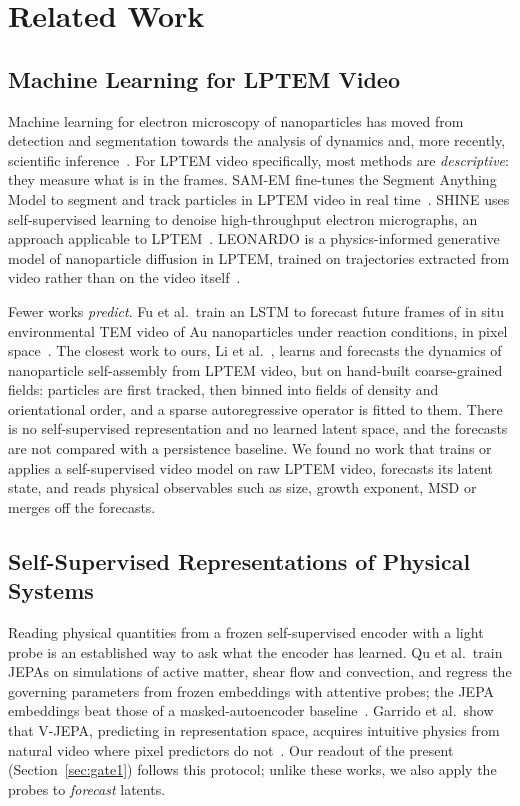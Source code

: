 \section{Related Work}
\label{sec:related}

\subsection{Machine Learning for LPTEM Video}

Machine learning for electron microscopy of nanoparticles has moved from detection and
segmentation towards the analysis of dynamics and, more recently, scientific
inference~\cite{toulkeridou2026review}. For LPTEM video specifically, most methods are
\emph{descriptive}: they measure what is in the frames. SAM-EM fine-tunes the Segment
Anything Model to segment and track particles in LPTEM video in real
time~\cite{samem}. SHINE uses self-supervised learning to denoise high-throughput
electron micrographs, an approach applicable to LPTEM~\cite{shine}. LEONARDO is a physics-informed
generative model of nanoparticle diffusion in LPTEM, trained on trajectories extracted
from video rather than on the video itself~\cite{leonardo}.

Fewer works \emph{predict}. Fu et al.\ train an LSTM to forecast future frames of in situ
environmental TEM video of Au nanoparticles under reaction conditions, in pixel
space~\cite{fu2022insitu}. The closest work to ours, Li et al.~\cite{li2026multiscale},
learns and forecasts the dynamics of nanoparticle self-assembly from LPTEM video, but on
hand-built coarse-grained fields: particles are first tracked, then binned into fields of
density and orientational order, and a sparse autoregressive operator is fitted to them.
There is no self-supervised representation and no learned latent space, and the forecasts
are not compared with a persistence baseline. We found no work that trains or applies a
self-supervised video model on raw LPTEM video, forecasts its latent state, and reads
physical observables such as size, growth exponent, MSD or merges off the forecasts.

\subsection{Self-Supervised Representations of Physical Systems}

Reading physical quantities from a frozen self-supervised encoder with a light probe is
an established way to ask what the encoder has learned. Qu et al.\ train JEPAs on
simulations of active matter, shear flow and convection, and regress the governing
parameters from frozen embeddings with attentive probes; the JEPA embeddings beat those of
a masked-autoencoder baseline~\cite{qu2026spatiotemporal}. Garrido et al.\ show that
V-JEPA, predicting in representation space, acquires intuitive physics from natural video
where pixel predictors do not~\cite{garrido2025intuitive}. Our readout of the present
(Section~\ref{sec:gate1}) follows this protocol; unlike these works, we also apply the probes to \emph{forecast} latents.

